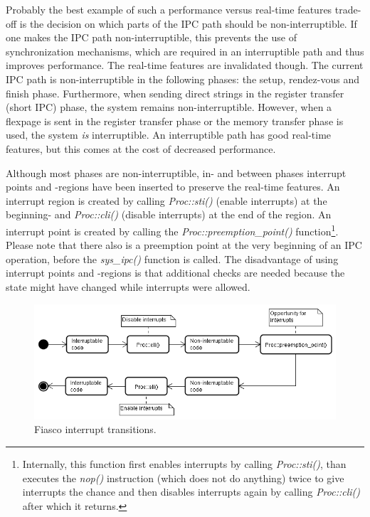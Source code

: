 Probably the best example of such a performance versus real-time features trade-off is the decision on which parts of the IPC path should be non-interruptible. If one makes the IPC path non-interruptible, this prevents the use of synchronization mechanisms, which are required in an interruptible path and thus improves performance. The real-time features are invalidated though. The current IPC path is non-interruptible in the following phases: the setup, rendez-vous and finish phase. Furthermore, when sending direct strings in the register transfer (short IPC) phase, the system remains non-interruptible. However, when a flexpage is sent in the register transfer phase or the memory transfer phase is used, the system \textit{is} interruptible. An interruptible path has good real-time features, but this comes at the cost of decreased performance.\emptyline

Although most phases are non-interruptible, in- and between phases interrupt points and -regions have been inserted to preserve the real-time features. An interrupt region is created by calling \emph{Proc::sti()} (enable interrupts) at the beginning- and \emph{Proc::cli()} (disable interrupts) at the end of the region. An interrupt point is created by calling the \emph{Proc::preemption\_point()} function\footnote{Internally, this function first enables interrupts by calling \emph{Proc::sti()}, than executes the \emph{nop()} instruction (which does not do anything) twice to give interrupts the chance and then disables interrupts again by calling \emph{Proc::cli()} after which it returns.}. Please note that there also is a preemption point at the very beginning of an IPC operation, before the \emph{sys\_ipc()} function is called. The disadvantage of using interrupt points and -regions is that additional checks are needed because the state might have changed while interrupts were allowed.

\begin{figure}[ht]
\includegraphics[scale=0.50]{images/diagrams/ipc_activity_interrupts}
\caption{Fiasco interrupt transitions.}
\end{figure}